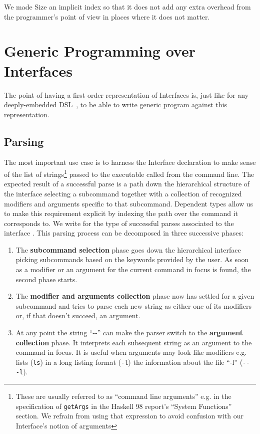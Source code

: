 \documentclass[preprint,9pt]{sigplanconf}
\begin{document}
We made Size an implicit index so that it does not add any extra
overhead from the programmer's point of view in places where it
does not matter.

\section{Generic Programming over Interfaces}

The point of having a first order representation of Interfaces
is, just like for any deeply-embedded DSL~\cite{hudak1996building},
to be able to write generic program against this representation.

\subsection{Parsing}

The most important use case is to harness the Interface declaration
to make sense of the list of strings\footnote{These are usually
referred to as ``command line arguments'' e.g. in the specification
of \texttt{getArgs} in the Haskell 98 report's ``System Functions''
section. We refrain from using that expression to avoid confusion
with our Interface's notion of arguments} passed to the executable
called from the command line. The expected result of a successful
parse is a path down the hierarchical structure of the interface
selecting a subcommand together with a collection of recognized
modifiers and arguments specific to that subcommand. Dependent types
allow us to make this requirement explicit by indexing the path
over the command it corresponds to. We write  
for the type of successful parses associated to the interface .
This parsing process can be decomposed in three successive phases:

\begin{enumerate}[wide, labelwidth=!, labelindent=0pt]
\item The \textbf{subcommand selection} phase goes down the hierarchical
interface picking subcommands based on the keywords provided by the
user. As soon as a modifier or an argument for the current command
in focus is found, the second phase starts.

\item The \textbf{modifier and arguments collection} phase now has
settled for a given subcommand and tries to parse each new string as
either one of its modifiers or, if that doesn't succeed, an argument.

\item At any point the string ``-{}-'' can make the parser switch to the
\textbf{argument collection} phase. It interprets each subsequent
string as an argument to the command in focus. It is useful when
arguments may look like modifiers e.g.  lists
(\texttt{ls}) in a long listing format (\texttt{-l}) the information
about the file ``-l'' (\texttt{-{}- -l}).
\end{enumerate}
\end{document}
